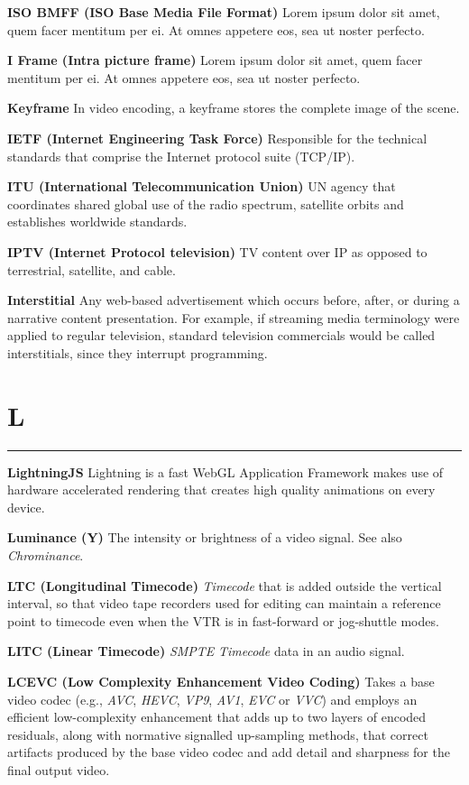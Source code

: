 \smallskip
\textbf{ISO BMFF (ISO Base Media File Format)}
Lorem ipsum dolor sit amet, quem facer mentitum per ei. At omnes appetere eos, sea ut noster perfecto.

\smallskip
\textbf{I Frame (Intra picture frame)}
Lorem ipsum dolor sit amet, quem facer mentitum per ei. At omnes appetere eos, sea ut noster perfecto.

\smallskip
\textbf{Keyframe}
In video encoding, a keyframe stores the complete image of the scene.

\smallskip
\textbf{IETF (Internet Engineering Task Force)}
Responsible for the technical standards that comprise the Internet protocol suite (TCP/IP).

\smallskip
\textbf{ITU (International Telecommunication Union)}
UN agency that coordinates shared global use of the radio spectrum, satellite orbits and establishes worldwide standards.

\medskip
\textbf{IPTV (Internet Protocol television)}
TV content over IP as opposed to terrestrial, satellite, and cable.

\smallskip
\textbf{Interstitial}
Any web-based advertisement which occurs before, after, or during a narrative content presentation. For example, if streaming media terminology were applied to regular television, standard television commercials would be called interstitials, since they interrupt programming.

\section{L}
\hrule

\medskip
\textbf{LightningJS}
Lightning is a fast WebGL Application Framework makes use of hardware accelerated rendering that creates high quality animations on every device.

\smallskip
\textbf{Luminance (Y)}
The intensity or brightness of a video signal. See also \textit{Chrominance}.

\smallskip
\textbf{LTC (Longitudinal Timecode)}
\textit{Timecode} that is added outside the vertical interval, so that video tape recorders used for editing can maintain a reference point to timecode even when the VTR is in fast-forward or jog-shuttle modes.

\smallskip
\textbf{LITC (Linear Timecode)}
\textit{SMPTE} \textit{Timecode} data in an audio signal.

\smallskip
\textbf{LCEVC (Low Complexity Enhancement Video Coding)}
Takes a base video codec (e.g., \textit{AVC}, \textit{HEVC}, \textit{VP9}, \textit{AV1}, \textit{EVC} or \textit{VVC}) and employs an efficient low-complexity enhancement that adds up to two layers of encoded residuals, along with normative signalled up-sampling methods, that correct artifacts produced by the base video codec and add detail and sharpness for the final output video.


